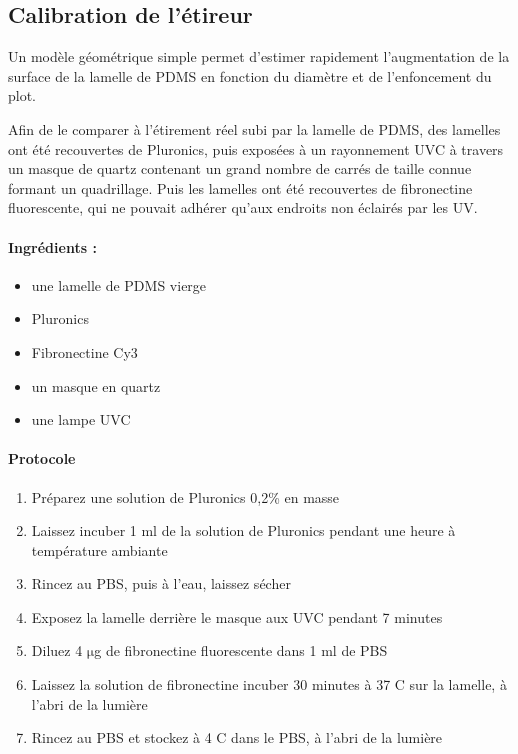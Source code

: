 \documentclass{report}
\newcommand{\micro}{$\mathrm{\mu}$}
\begin{document}
	\subsection{Calibration de l'étireur}
	
	Un modèle géométrique simple permet d'estimer rapidement l'augmentation de la surface de la lamelle de PDMS en fonction du diamètre et de l'enfoncement du plot. 
	
	
	
	
	Afin de le comparer à l'étirement réel subi par la lamelle de PDMS, des lamelles ont été recouvertes de Pluronics, puis exposées à un rayonnement UVC à travers un masque de quartz contenant un grand nombre de carrés de taille connue formant un quadrillage. Puis les lamelles ont été recouvertes de fibronectine fluorescente, qui ne pouvait adhérer qu'aux endroits non éclairés par les UV. 
	
	\paragraph{Ingrédients : }
	\begin{itemize}
	\item une lamelle de PDMS vierge
	\item Pluronics
	\item Fibronectine Cy3
	\item un masque en quartz 
	\item une lampe UVC
	\end{itemize}
	
	\paragraph{Protocole}
	\begin{enumerate}
	\item Préparez une solution de Pluronics 0,2\% en masse
	\item Laissez incuber 1 ml de la solution de Pluronics pendant une heure à température ambiante
	\item Rincez au PBS, puis à l'eau, laissez sécher
	\item Exposez la lamelle derrière le masque aux UVC pendant 7 minutes
	\item Diluez 4 \micro g de fibronectine fluorescente dans 1 ml de PBS
	\item Laissez la solution de fibronectine incuber 30 minutes à 37 \degres C sur la lamelle, à l'abri de la lumière
	\item Rincez au PBS et stockez à 4 \degres C dans le PBS, à l'abri de la lumière
\end{enumerate}		
	
\end{document}
